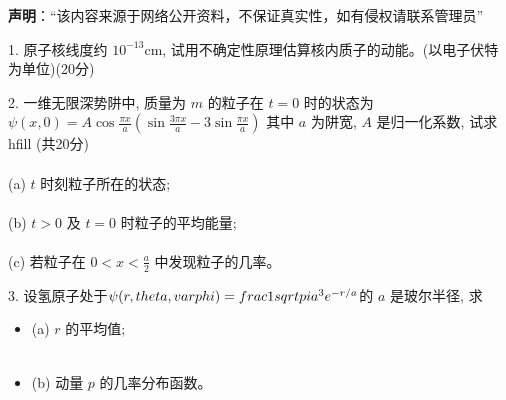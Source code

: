 
\textbf{声明}：“该内容来源于网络公开资料，不保证真实性，如有侵权请联系管理员”

1. 原子核线度约 $10^{-13} \text{cm}$, 试用不确定性原理估算核内质子的动能。(以电子伏特为单位)\hfill (20分)

2. 一维无限深势阱中, 质量为 $m$ 的粒子在 $t=0$ 时的状态为 
$\psi(x,0) = A \cos \frac{\pi x}{a} \left( \sin \frac{3 \pi x}{a} - 3 \sin \frac{\pi x}{a} \right)$
其中 $a$ 为阱宽, $A$ 是归一化系数, 试求 \\hfill (共20分) \\\\
\quad (a) $t$ 时刻粒子所在的状态; \\\\
\quad (b) $t>0$ 及 $t=0$ 时粒子的平均能量; \\\\
\quad (c) 若粒子在 $0 < x < \frac{a}{2}$ 中发现粒子的几率。

3. 设氢原子处于$\psi(r, \\theta, \\varphi) = \\frac{1}{\\sqrt{\\pi a^3}} e^{-r/a}$的 $a$ 是玻尔半径, 求 
\begin{itemize}
\item (a) $r$ 的平均值; \\\\
\item  (b) 动量 $p$ 的几率分布函数。

\end{itemize}